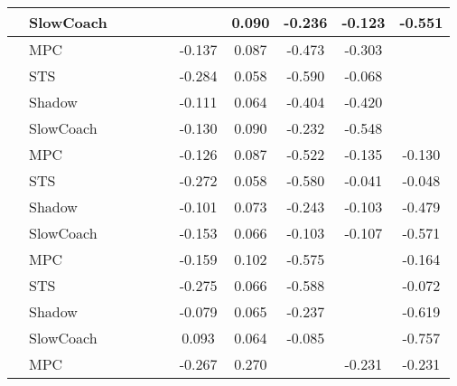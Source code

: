 \begin{tabular}{|l|l|*{9}{c|}}
                                                           & SlowCoach &       &        &        &     &     &  0.090 &  -0.236 &  -0.123 &   -0.551 \\
\midrule
[False, False, False, False, True, True, True, True, False] & MPC &       &        &        &     & -0.137 &  0.087 &  -0.473 &  -0.303 &       \\
                                                           & STS &       &        &        &     & -0.284 &  0.058 &  -0.590 &  -0.068 &       \\
                                                           & Shadow &       &        &        &     & -0.111 &  0.064 &  -0.404 &  -0.420 &       \\
                                                           & SlowCoach &       &        &        &     & -0.130 &  0.090 &  -0.232 &  -0.548 &       \\
\midrule
[False, False, False, False, True, True, True, True, True] & MPC &       &        &        &     & -0.126 &  0.087 &  -0.522 &  -0.135 &   -0.130 \\
                                                           & STS &       &        &        &     & -0.272 &  0.058 &  -0.580 &  -0.041 &   -0.048 \\
                                                           & Shadow &       &        &        &     & -0.101 &  0.073 &  -0.243 &  -0.103 &   -0.479 \\
                                                           & SlowCoach &       &        &        &     & -0.153 &  0.066 &  -0.103 &  -0.107 &   -0.571 \\
\midrule
[False, False, False, False, True, True, True, False, True] & MPC &       &        &        &     & -0.159 &  0.102 &  -0.575 &      &   -0.164 \\
                                                           & STS &       &        &        &     & -0.275 &  0.066 &  -0.588 &      &   -0.072 \\
                                                           & Shadow &       &        &        &     & -0.079 &  0.065 &  -0.237 &      &   -0.619 \\
                                                           & SlowCoach &       &        &        &     &  0.093 &  0.064 &  -0.085 &      &   -0.757 \\
\midrule
[False, False, False, False, True, True, False, True, True] & MPC &       &        &        &     & -0.267 &  0.270 &      &  -0.231 &   -0.231 \\

\end{tabular}
